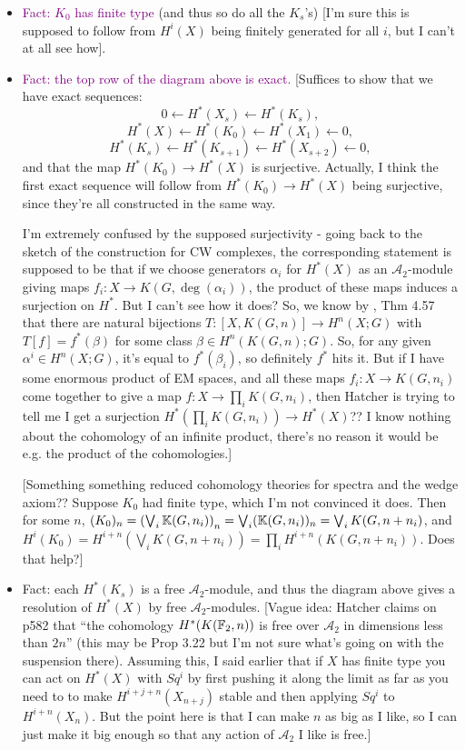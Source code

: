 \documentclass{MetricNotes2023}
\def\bb{\ensuremath\mathbb}
\def\A{\ensuremath{\mathscr{A}_2}}
\def\textcolour{\textcolor}
\begin{document}
\begin{itemize}
\item \textcolour{purple}{Fact: \(K_0\) has finite type} (and thus so do all the \(K_s\)'s) [I'm sure this is supposed to follow from \(H^i(X)\) being finitely generated for all \(i\), but I can't at all see how].
\item \textcolour{purple}{Fact: the top row of the diagram above is exact.} [Suffices to show that we have exact sequences: 
\[0 \leftarrow H^*(X_s)\leftarrow H^*(K_s),\]
\[H^*(X) \leftarrow H^*(K_0) \leftarrow H^*(X_1)\leftarrow 0,\]
\[H^*(K_s) \leftarrow H^*(K_{s+1}) \leftarrow H^*(X_{s+2})\leftarrow 0,\]
and that the map \(H^*(K_0)\to H^*(X)\) is surjective. Actually, I think the first exact sequence will follow from \(H^*(K_0)\to H^*(X)\) being surjective, since they're all constructed in the same way.

I'm extremely confused by the supposed surjectivity - going back to the sketch of the construction for CW complexes, the corresponding statement is supposed to be that if we choose generators \(\alpha_i\) for \(H^*(X)\) as an \(\A\)-module giving maps \(f_i : X \to K(G, \deg(\alpha_i))\), the product of these maps induces a surjection on \(H^*\). But I can't see how it does? So, we know by \autocite{hatcher}, Thm 4.57  that there are natural bijections \(T : [X, K(G,n)]\to H^n(X;G)\) with \(T[f]=f^*(\beta)\) for some class \(\beta \in H^n(K(G,n); G)\). So, for any given \(\alpha^i\in H^n(X;G)\), it's equal to \(f^*(\beta_i)\), so definitely \(f^*\) hits it. But if I have some enormous product of EM spaces, and all these maps \(f_i : X \to K(G, n_i)\) come together to give a map \(f : X \to \prod_i K(G,n_i)\), then Hatcher is trying to tell me I get a surjection \(H^*(\prod_i K(G, n_i))\to H^*(X)\)?? I know nothing about the cohomology of an infinite product, there's no reason it would be e.g. the product of the cohomologies.]

[Something something reduced cohomology theories for spectra and the wedge axiom?? Suppose \(K_0\) had finite type, which I'm not convinced it does. Then for some \(n\), \((K_0)_n=\left(\bigvee_i \bb{K}(G, n_i)\right)_n=\bigvee_i (\bb{K}(G, n_i))_n=\bigvee_i K(G, n+n_i)\), and \(H^i(K_0)=H^{i+n}(\bigvee_i K(G, n+n_i))=\prod_i H^{i+n}(K(G, n+n_i))\). Does that help?]

\item Fact: each \(H^*(K_s)\) is a free \(\A\)-module, and thus the diagram above gives a resolution of \(H^*(X)\) by free \(\A\)-modules. [Vague idea: Hatcher claims on p582 that ``the cohomology \(H^*(K(\bb{F}_2,n))\) is free over \(\A\) in dimensions less than \(2n\)'' (this may be \autocite{ass} Prop 3.22 but I'm not sure what's going on with the suspension there). Assuming this, I said earlier that if \(X\) has finite type you can act on \(H^*(X)\) with \(Sq^i\) by first pushing it along the limit as far as you need to to make \(H^{i+j+n}(X_{n+j})\) stable and then applying \(Sq^i\) to \(H^{i+n}(X_n)\). But the point here is that I can make \(n\) as big as I like, so I can just make it big enough so that any action of \(\A\) I like is free.]
\end{itemize}
\end{document}
